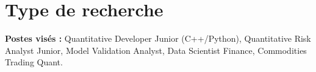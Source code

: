\section*{Type de recherche}
\noindent\textbf{Postes visés :} Quantitative Developer Junior (C++/Python), Quantitative Risk Analyst Junior, Model Validation Analyst, Data Scientist Finance, Commodities Trading Quant.
